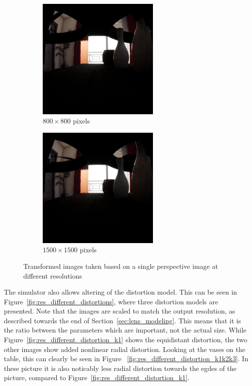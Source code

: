\begin{figure}[!htb]
    \begin{subfigure}{0.45\textwidth}
        \centering
        \includegraphics[height=6cm]{rapport/fig/Results/single/single_1024_800.jpeg}
        \caption{$800 \times 800$ pixels}
        \label{fig:res_comp_single_1024_800}
    \end{subfigure}
    \begin{subfigure}{0.45\textwidth}
        \centering
        \includegraphics[height=6cm]{rapport/fig/Results//single/single_2048_1500.jpeg}
        \caption{$1500 \times 1500$ pixels}
        \label{fig:res_comp_single_2048_1500}
    \end{subfigure}
    \caption{Transformed images taken based on a single perspective image at different resolutions}
    \label{fig:res_comp_single}    
\end{figure}

The simulator also allows altering of the distortion model. This can be seen in Figure~\ref{fig:res_different_distortions}, where three distortion models are presented. Note that the images are scaled to match the output resolution, as described towards the end of Section~\ref{sec:lens_modeling}. This means that it is the ratio between the parameters which are important, not the actual size. While Figure~\ref{fig:res_different_distortion_k1} shows the equidistant distortion, the two other images show added nonlinear radial distortion. Looking at the vases on the table, this can clearly be seen in Figure~ \ref{fig:res_different_distortion_k1k2k3}. In these picture it is also noticably less radial distortion towards the egdes of the picture, compared to Figure~\ref{fig:res_different_distortion_k1}.


